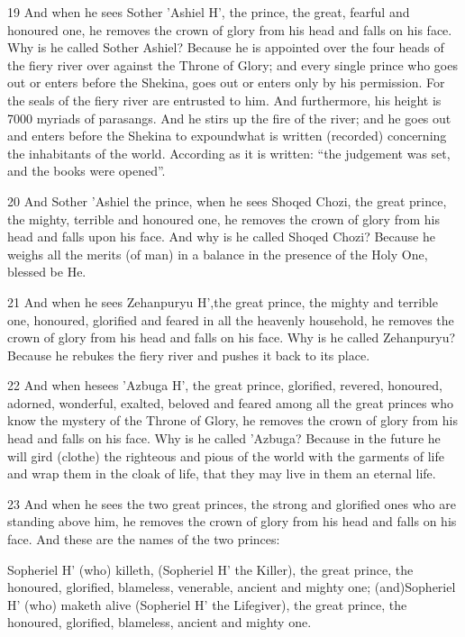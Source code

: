 \par 19 And when he sees Sother 'Ashiel H', the prince, the great, fearful and honoured one, he removes the crown of glory from his head and falls on his face. Why is he called Sother Ashiel? Because he is appointed over the four heads of the fiery river over against the Throne of Glory; and every single prince who goes out or enters before the Shekina, goes out or enters only by his permission. For the seals of the fiery river are entrusted to him. And furthermore, his height is 7000 myriads of parasangs. And he stirs up the fire of the river; and he goes out and enters before the Shekina to expoundwhat is written (recorded) concerning the inhabitants of the world. According as it is written: “the judgement was set, and the books were opened”.

\par 20 And Sother 'Ashiel the prince, when he sees Shoqed Chozi, the great prince, the mighty, terrible and honoured one, he removes the crown of glory from his head and falls upon his face. And why is he called Shoqed Chozi? Because he weighs all the merits (of man) in a balance in the presence of the Holy One, blessed be He. 

\par 21 And when he sees Zehanpuryu H',the great prince, the mighty and terrible one, honoured, glorified and feared in all the heavenly household, he removes the crown of glory from his head and falls on his face. Why is he called Zehanpuryu? Because he rebukes the fiery river and pushes it back to its place. 

\par 22 And when hesees 'Azbuga H', the great prince, glorified, revered, honoured, adorned, wonderful, exalted, beloved and feared among all the great princes who know the mystery of the Throne of Glory, he removes the crown of glory from his head and falls on his face. Why is he called 'Azbuga? Because in the future he will gird (clothe) the righteous and pious of the world with the garments of life and wrap them in the cloak of life, that they may live in them an eternal life. 

\par 23 And when he sees the two great princes, the strong and glorified ones who are standing above him, he removes the crown of glory from his head and falls on his face. And these are the names of the two princes: 

\par Sopheriel H' (who) killeth, (Sopheriel H' the Killer), the great prince, the honoured, glorified, blameless, venerable, ancient and mighty one; (and)Sopheriel H' (who) maketh alive (Sopheriel H' the Lifegiver), the great prince, the honoured, glorified, blameless, ancient and mighty one. 

